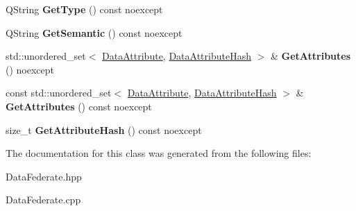 \begin{DoxyCompactItemize}
Q\+String {\bfseries Get\+Type} () const noexcept
\item 
\mbox{\label{classUPIM_1_1DATA_1_1DataFederate_a3be1884d8ddcd3b9637a9603eca48a53}} 
Q\+String {\bfseries Get\+Semantic} () const noexcept
\item 
\mbox{\label{classUPIM_1_1DATA_1_1DataFederate_a0fad92ba02b9ea94e19d277a9f92fb2a}} 
std\+::unordered\+\_\+set$<$ \hyperlink{classUPIM_1_1DATA_1_1DataAttribute}{Data\+Attribute}, \hyperlink{structUPIM_1_1DATA_1_1DataAttributeHash}{Data\+Attribute\+Hash} $>$ \& {\bfseries Get\+Attributes} () noexcept
\item 
\mbox{\label{classUPIM_1_1DATA_1_1DataFederate_a4c1017cdb26eb282ae2c6ebecccc8822}} 
const std\+::unordered\+\_\+set$<$ \hyperlink{classUPIM_1_1DATA_1_1DataAttribute}{Data\+Attribute}, \hyperlink{structUPIM_1_1DATA_1_1DataAttributeHash}{Data\+Attribute\+Hash} $>$ \& {\bfseries Get\+Attributes} () const noexcept
\item 
\mbox{\label{classUPIM_1_1DATA_1_1DataFederate_aebada7ebd387b655fa3e3fdff0f51780}} 
size\+\_\+t {\bfseries Get\+Attribute\+Hash} () const noexcept
\end{DoxyCompactItemize}


The documentation for this class was generated from the following files\+:\begin{DoxyCompactItemize}
\item 
Data\+Federate.\+hpp\item 
Data\+Federate.\+cpp\end{DoxyCompactItemize}
